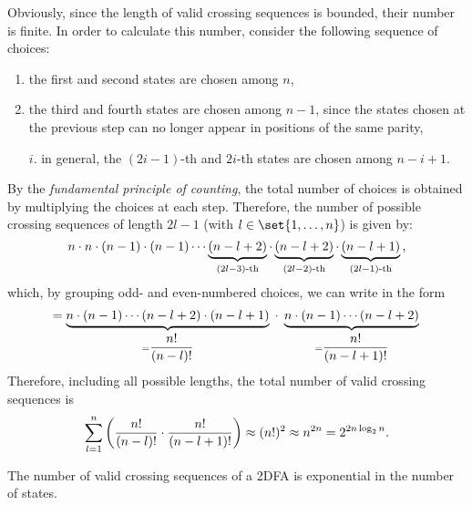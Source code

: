 Obviously, since the length of valid crossing sequences is bounded, their number is finite.
In order to calculate this number, consider the following sequence of choices:
\begin{enumerate}
	\item \label{itm:num-crosseq-1} the first and second states are chosen among $n$,
	\item the third and fourth states are chosen among $n-1$, since the states chosen at the previous step can no longer appear in positions of the same parity,
	\item[$i$.] in general, the $(2i-1)$-th and $2i$-th states are chosen among $n-i+1$.
\end{enumerate}
By the \emph{fundamental principle of counting}, the total number of choices is obtained by multiplying the choices at each step.
Therefore, the number of possible crossing sequences of length $2l-1$ (with $l\in\set{1,\dots,n}$) is given by:
\begin{equation*}
	n \cdot n \cdot (n-1) \cdot (n-1) \cdots \underbrace{(n-l+2)}_{(2l-3)\text{-th}} \cdot \underbrace{(n-l+2)}_{(2l-2)\text{-th}} \cdot \underbrace{(n-l+1)}_{(2l-1)\text{-th}} \text,
\end{equation*}
which, by grouping odd- and even-numbered choices, we can write in the form
\begin{equation*}
	= \underbrace{n \cdot (n-1) \cdots (n-l+2) \cdot (n-l+1)}_{=\dfrac{n!}{(n-l)!}} \; \cdot \; \underbrace{n \cdot (n-1) \cdots (n-l+2)}_{=\dfrac{n!}{(n-l+1)!}} \\
\end{equation*}
Therefore, including all possible lengths, the total number of valid crossing sequences is
\begin{align*}
	\sum_{l=1}^n \left(\frac{n!}{(n-l)!}\cdot\frac{n!}{(n-l+1)!}\right) \approx (n!)^2 \approx n^{2n} = 2^{2n \log_2 n} \text.
\end{align*}

\begin{fact}\label{fact:crossing-2DFA-num}
	The number of valid crossing sequences of a 2DFA is exponential in the number of states.
\end{fact}


